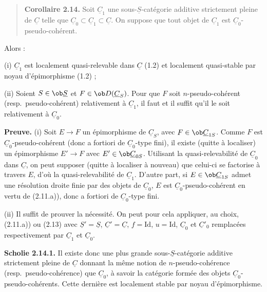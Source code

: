 \begin{quote}
\textbf{Corollaire 2.14.} Soit $\underline{C}_1$ une sous-$\underline{S}$-catégorie additive strictement pleine de $\underline{C}$ telle que $\underline{C}_0 \subset \underline{C}_1 \subset \underline{C}$. On suppose que tout objet de $\underline{C}_1$ est $\underline{C}_0$-pseudo-cohérent.
\end{quote}

Alors :

(i) $\underline{C}_1$ est localement quasi-relevable dans $\underline{C}$ (1.2) et localement quasi-stable par noyau d'épimorphisme (1.2) ;

(ii) Soient $S \in \ob \underline{S}$ et $F \in \ob D(\underline{C}_S)$. Pour que $F$ soit $n$-pseudo-cohérent (resp.\ pseudo-cohérent) relativement à $\underline{C}_1$, il faut et il suffit qu'il le soit relativement à $\underline{C}_0$.

\textbf{Preuve.} (i) Soit $E \to F$ un épimorphisme de $\underline{C}_S$, avec $F \in \ob \underline{C}_{1S}$. Comme $F$ est $\underline{C}_0$-pseudo-cohérent (donc a fortiori de $\underline{C}_0$-type fini), il existe (quitte à localiser) un épimorphisme $E' \to F$ avec $E' \in \ob \underline{C}_{0S}$. Utilisant la quasi-relevabilité de $\underline{C}_0$ dans $\underline{C}$, on peut supposer (quitte à localiser à nouveau) que celui-ci se factorise à travers $E$, d'où la quasi-relevabilité de $\underline{C}_1$. D'autre part, si $E \in \ob \underline{C}_{1S}$ admet une résolution droite finie par des objets de $\underline{C}_0$, $E$ est $\underline{C}_0$-pseudo-cohérent en vertu de (2.11.a)), donc a fortiori de $\underline{C}_0$-type fini.

(ii) Il suffit de prouver la nécessité. On peut pour cela appliquer, au choix, (2.11.a)) ou (2.13) avec $\underline{S}' = \underline{S}$, $\underline{C}' = \underline{C}$, $f = \mathrm{Id}$, $u = \mathrm{Id}$, $\underline{C}_0$ et $\underline{C}'_0$ remplacées respectivement par $\underline{C}_1$ et $\underline{C}_0$.

\textbf{Scholie 2.14.1.} Il existe donc une plus grande sous-$\underline{S}$-catégorie additive strictement pleine de $\underline{C}$ donnant la même notion de $n$-pseudo-cohérence (resp.\ pseudo-cohérence) que $\underline{C}_0$, à savoir la catégorie formée des objets $\underline{C}_0$-pseudo-cohérents. Cette dernière est localement stable par noyau d'épimorphisme.


